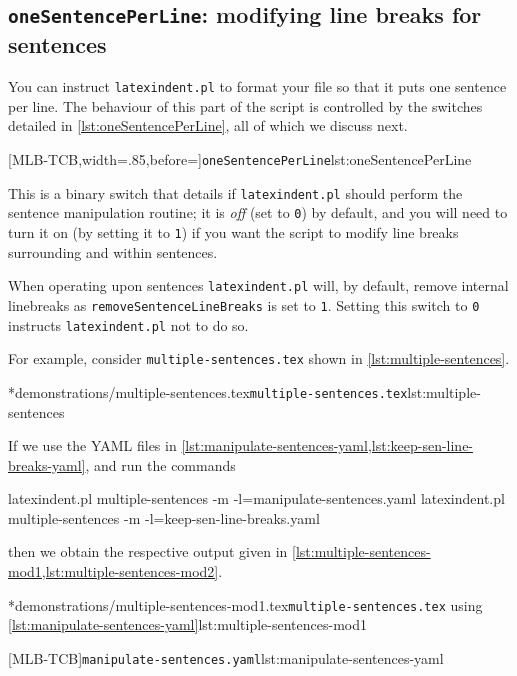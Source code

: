 \subsection{\texttt{oneSentencePerLine}: modifying line breaks for sentences}\label{sec:onesentenceperline}
	You can instruct \texttt{latexindent.pl} to format%
	 your file so that it puts one sentence
	per line. The behaviour of this part of the script is controlled by the switches detailed in \cref{lst:oneSentencePerLine},
	all of which we discuss next.

	[MLB-TCB,width=.85\linewidth,before=\centering]{\texttt{oneSentencePerLine}}{lst:oneSentencePerLine}

	This is a binary switch that details if \texttt{latexindent.pl} should perform the sentence manipulation routine; it
	is \emph{off} (set to \texttt{0}) by default, and you will need to turn it on (by setting it to \texttt{1}) if you want the script
	to modify line breaks surrounding and within sentences.

	When operating upon sentences \texttt{latexindent.pl} will, by default, remove internal linebreaks as \texttt{removeSentenceLineBreaks}
	is set to \texttt{1}. Setting this switch to \texttt{0} instructs \texttt{latexindent.pl} not to do so.

	For example, consider \texttt{multiple-sentences.tex} shown in \cref{lst:multiple-sentences}.

	\cmhlistingsfromfile*[showspaces=false]*{demonstrations/multiple-sentences.tex}{\texttt{multiple-sentences.tex}}{lst:multiple-sentences}

	If we use the YAML files in \cref{lst:manipulate-sentences-yaml,lst:keep-sen-line-breaks-yaml}, and run the commands
	\begin{widepage}
		\begin{commandshell}
latexindent.pl multiple-sentences -m -l=manipulate-sentences.yaml
latexindent.pl multiple-sentences -m -l=keep-sen-line-breaks.yaml
	\end{commandshell}
	\end{widepage}
	then we obtain the respective output given in \cref{lst:multiple-sentences-mod1,lst:multiple-sentences-mod2}.

	\begin{minipage}{.5\linewidth}
		\cmhlistingsfromfile*[showspaces=false]*{demonstrations/multiple-sentences-mod1.tex}{\texttt{multiple-sentences.tex} using \cref{lst:manipulate-sentences-yaml}}{lst:multiple-sentences-mod1}
	\end{minipage}
	\hfill
	\begin{minipage}{.5\linewidth}
		[MLB-TCB]{\texttt{manipulate-sentences.yaml}}{lst:manipulate-sentences-yaml}
	\end{minipage}

